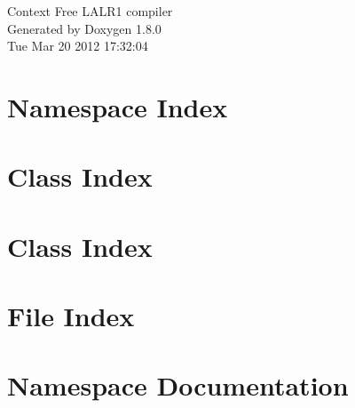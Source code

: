 \documentclass{book}
\begin{document}
\hypersetup{pageanchor=false,citecolor=blue}
\begin{titlepage}
\vspace*{7cm}
\begin{center}
{\Large Context Free L\-A\-L\-R1 compiler }\\
\vspace*{1cm}
{\large Generated by Doxygen 1.8.0}\\
\vspace*{0.5cm}
{\small Tue Mar 20 2012 17:32:04}\\
\end{center}
\end{titlepage}
\clearemptydoublepage
{}
\tableofcontents
\clearemptydoublepage
{}
\hypersetup{pageanchor=true,citecolor=blue}
\chapter{Namespace Index}

\chapter{Class Index}

\chapter{Class Index}

\chapter{File Index}

\chapter{Namespace Documentation}






\end{document}
